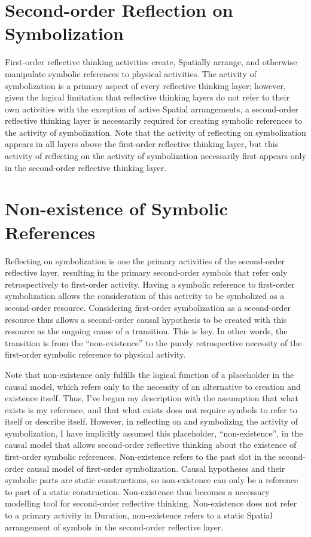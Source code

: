 \section{Second-order Reflection on Symbolization}

First-order reflective thinking activities create, Spatially arrange,
and otherwise manipulate symbolic references to physical activities.
The activity of symbolization is a primary aspect of every reflective
thinking layer; however, given the logical limitation that reflective
thinking layers do not refer to their own activities with the
exception of active Spatial arrangements, a second-order reflective
thinking layer is necessarily required for creating symbolic
references to the activity of symbolization.  Note that the activity
of reflecting on symbolization appears in all layers above the
first-order reflective thinking layer, but this activity of reflecting
on the activity of symbolization necessarily first appears only in the
second-order reflective thinking layer.

\section{Non-existence of Symbolic References}

Reflecting on symbolization is one the primary activities of the
second-order reflective layer, resulting in the primary second-order
symbols that refer only retrospectively to first-order activity.
Having a symbolic reference to first-order symbolization allows the
consideration of this activity to be symbolized as a second-order
resource.  Considering first-order symbolization as a second-order
resource thus allows a second-order causal hypothesis to be created
with this resource as the ongoing cause of a transition.  This is key.
In other words, the transition is from the ``non-existence'' to the
purely retrospective necessity of the first-order symbolic reference
to physical activity.

Note that non-existence only fulfills the logical function of a
placeholder in the causal model, which refers only to the necessity of
an alternative to creation and existence itself.  Thus, I've begun my
description with the assumption that what exists is my reference, and
that what exists does not require symbols to refer to itself or
describe itself.  However, in reflecting on and symbolizing the
activity of symbolization, I have implicitly assumed this placeholder,
``non-existence'', in the causal model that allows second-order
reflective thinking about the existence of first-order symbolic
references.  Non-existence refers to the past slot in the second-order
causal model of first-order symbolization.  Causal hypotheses and
their symbolic parts are static constructions, so non-existence can
only be a reference to part of a static construction.  Non-existence
thus becomes a necessary modelling tool for second-order reflective
thinking.  Non-existence does not refer to a primary activity in
Duration, non-existence refers to a static Spatial arrangement of
symbols in the second-order reflective layer.

